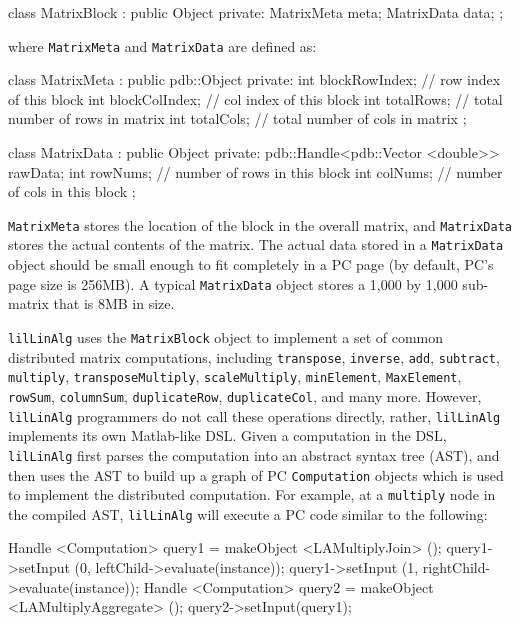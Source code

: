 \begin{code}
class MatrixBlock : public Object {
private:
    MatrixMeta meta;
    MatrixData data;
};
\end{code}

\noindent where \texttt{MatrixMeta} and \texttt{MatrixData} are defined as:

\begin{code}
class MatrixMeta : public pdb::Object {
private:
    int blockRowIndex; // row index of this block
    int blockColIndex; // col index of this block
    int totalRows; // total number of rows in matrix 
    int totalCols; // total number of cols in matrix
};

class MatrixData : public Object {
private:
    pdb::Handle<pdb::Vector <double>> rawData;
    int rowNums; // number of rows in this block
    int colNums; // number of cols in this block
};
\end{code}

\noindent \texttt{MatrixMeta} stores the location of the block in the overall matrix, and
\texttt{MatrixData} stores the actual contents of the matrix.
The actual data stored in a \texttt{MatrixData} object should be small enough to fit completely in 
a PC page (by default, PC's page size is 256MB).  A typical \texttt{MatrixData} object stores a
1,000 by 1,000 sub-matrix that is 8MB in size.

\texttt{lilLinAlg} uses the \texttt{MatrixBlock} object to implement a set of common distributed matrix
computations, including \texttt{transpose},
\texttt{inverse}, \texttt{add}, \texttt{subtract}, \texttt{multiply}, \texttt{transposeMultiply}, 
\texttt{scaleMultiply}, \texttt{minElement},
\texttt{MaxElement}, \texttt{rowSum}, \texttt{columnSum}, \texttt{duplicateRow}, \texttt{duplicateCol}, 
and many more.  However, \texttt{lilLinAlg} programmers do not call these operations directly, rather,
\texttt{lilLinAlg} implements its own Matlab-like DSL.  
Given a computation in the DSL, \texttt{lilLinAlg} first parses the computation into an abstract syntax tree (AST), and then
uses the AST to build up a graph of PC \texttt{Computation} objects which is used to implement the distributed computation.
For example, at a \texttt{multiply} node in the compiled AST, \texttt{lilLinAlg} 
will execute a PC code similar to the following:

\begin{codesmall}
Handle <Computation> query1 = makeObject <LAMultiplyJoin> ();
query1->setInput (0, leftChild->evaluate(instance));
query1->setInput (1, rightChild->evaluate(instance));
Handle <Computation> query2 = makeObject <LAMultiplyAggregate> ();
query2->setInput(query1);
\end{codesmall}

